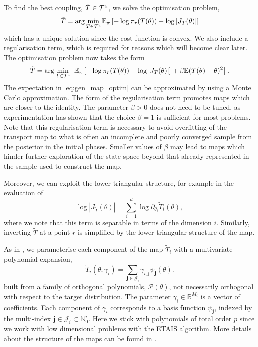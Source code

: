 \documentclass[final]{siamltex}
\newcommand{\edit}[1]{#1}
\newcommand{\ltri}{%
\,\resizebox{!}{0.25\baselineskip}{%
\begin{tikzpicture}%
\draw[line width=1mm](0,0) -- (0,2) -- (2,0)  -- (0,0);
\end{tikzpicture}%
}\xspace%
}%
\newcommand{\smallltri}{%
\,\resizebox{!}{0.15\baselineskip}{%
\begin{tikzpicture}%
\draw[line width=1mm](0,0) -- (0,2) -- (2,0)  -- (0,0);
\end{tikzpicture}%
}\xspace%
}%
\begin{document}
To find the best coupling, $\tilde{T} \in \mathcal{T}^{\ltri}$, we solve the optimisation problem,
\begin{equation}
	\tilde{T} = \arg\min_{T \in \mathcal{T}^{\smallltri}} \mathbb{E}_\pi\left[-\log\pi_r(T(\theta)) -
		\log\left|J_T(\theta)\right|\right]
\end{equation}
which has a unique solution since the cost function is convex. We also include a regularisation term, which is required for reasons which will become clear later. The optimisation problem now takes the form
\begin{equation}\label{eq:gen_map_optim}
	\tilde{T} = \arg\min_{T\in\mathcal{T}^{\smallltri}} \left[
		 \mathbb{E}_\pi\left[-\log\pi_r(T(\theta)) -
		\log\left|J_T(\theta)\right|\right] + \beta\mathbb{E}(T(\theta)- \theta)^2 \right].
\end{equation}
\edit{The expectation in \eqref{eq:gen_map_optim} can be
approximated by using a Monte Carlo approximation. The form of the regularisation term promotes maps which are
closer to the identity. The parameter $\beta>0$ does not need to be tuned, as experimentation has shown that the choice
$\beta=1$ is sufficient for most problems. Note that this
regularisation term is necessary to avoid overfitting of the transport
map to what is often an incomplete and poorly converged sample from
the posterior in the initial phases. Smaller values of $\beta$ may lead to maps which
hinder further exploration of the state space beyond that already
represented in the sample used to construct the map.}

\edit{Moreover, we can exploit the lower triangular
  structure, for example in the evaluation of 
\begin{equation}\label{eqn:separable_jacobian}
	\log\left|J_{\tilde{T}}(\theta)\right| = \sum\limits_{i=1}^d \! \log \partial_{\theta_i} \tilde{T}_i(\theta),
\end{equation}
where we note that this term is separable in terms of the dimension
$i$. Similarly, inverting $\tilde{T}$ at a point $r$ is simplified by the lower triangular structure of the map.

As in \cite{parno2018transport}, we parameterise each component of the
map $\tilde{T}_i$ with a multivariate polynomial expansion,
\begin{equation}\label{eq:map_defn}
	\tilde{T}_i(\theta; \gamma_i) = \sum\limits_{\mathbf{j}\in\mathcal{J}_i} \!
\gamma_{i,\mathbf{j}}\psi_\mathbf{j}(\theta).
\end{equation}
built from
a family of orthogonal polynomials, $\mathcal{P}(\theta)$, not
necessarily orthogonal with respect to the target distribution. The parameter $\gamma_i \in \mathbb{R}^{M_i}$ is a vector of coefficients. Each component of $\gamma_i$ corresponds to a basis function
$\psi_\mathbf{j}$, indexed by the multi-index $\mathbf{j} \in
\mathcal{J}_i \subset \mathbb{N}_0^i$. 
Here we stick with polynomials of total order $p$ since we work with
low dimensional problems with the ETAIS algorithm. More details about
the structure of the maps can be found in  \cite{parno2018transport}.}
\end{document}
